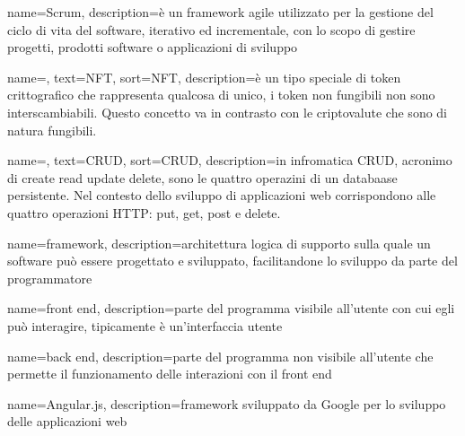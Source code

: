 {
	name={Scrum},
	description={è un framework agile utilizzato per la gestione del ciclo di vita del software, iterativo ed incrementale, con lo scopo di gestire progetti, prodotti software o applicazioni di sviluppo}
}

{
	name=,
	text=NFT,
	sort=NFT,
	description={è un tipo speciale di token crittografico che rappresenta qualcosa di unico, i token non fungibili non sono interscambiabili. Questo concetto va in contrasto con le criptovalute che sono di natura fungibili.}
}

{
	name=,
	text=CRUD,
	sort=CRUD,
	description={in infromatica CRUD, acronimo di create read update delete, sono le quattro operazini di un databaase persistente. Nel contesto dello sviluppo di applicazioni web corrispondono alle quattro operazioni HTTP: put, get, post e delete.}
}

{
	name={framework},
	description={architettura logica di supporto sulla quale un software può essere progettato e sviluppato, facilitandone lo sviluppo da parte del programmatore}
}

{
	name={front end},
	description={parte del programma visibile all'utente con cui egli può interagire, tipicamente è un'interfaccia utente}
}

{
	name={back end},
	description={parte del programma non visibile all'utente che permette il funzionamento delle interazioni con il front end}
}

{
	name={Angular.js},
	description={framework sviluppato da Google per lo sviluppo delle applicazioni web}
}